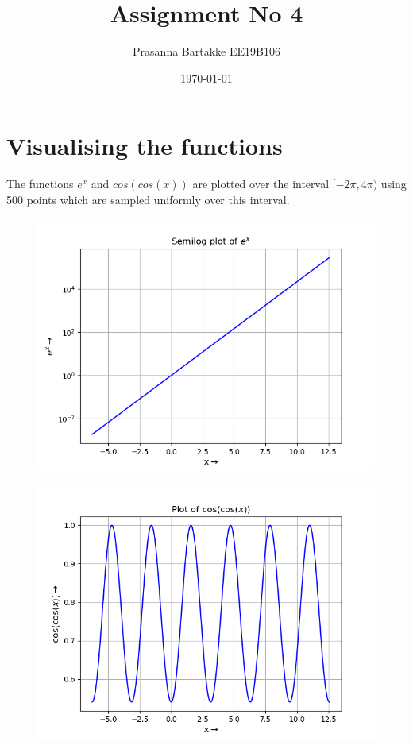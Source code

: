 \documentclass[11pt, a4paper]{article}
\title{Assignment No 4} %
\author{Prasanna Bartakke EE19B106} %
\date{\today} %
\begin{document}
		
		
\maketitle %
\section{Visualising the functions}
The functions $e^x$ and $cos(cos(x))$ are plotted over the interval $[-2\pi, 4\pi)$ using 500 points which are sampled uniformly over this interval.

\begin{figure}
\centering
\begin{minipage}{.5\textwidth}
  \centering
  \includegraphics[width=\linewidth]{fig1.png}
  \label{fig:test1}
\end{minipage}%
\begin{minipage}{.5\textwidth}
  \centering
  \includegraphics[width=\linewidth]{fig2.png}
  \label{fig:test2}
\end{minipage}
\end{figure}
\end{document}
